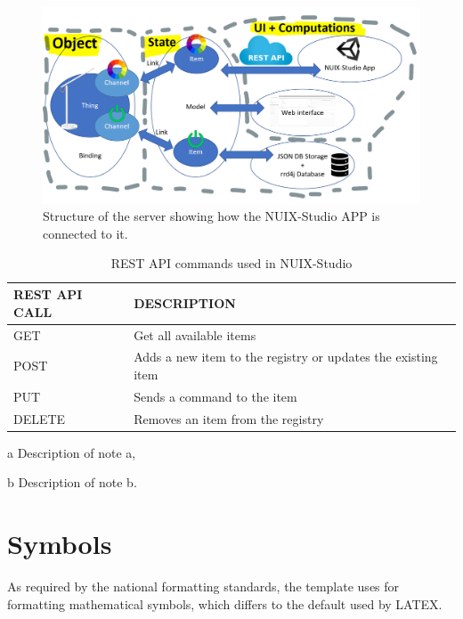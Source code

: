 \begin{figure}
  \centering
  \includegraphics[width=0.9\linewidth]{figures/ExtendedServerStructure.png}
  \caption{Structure of the server showing how the NUIX-Studio APP is connected to it.}
  \label{fig:ExtendedServerStructure-figure}
\end{figure}

\begin{table}
  \centering
  \begin{threeparttable}[c]
    \caption{REST API commands used in NUIX-Studio}
    \label{tab:three-part-table}
    \begin{tabular}{ll}
      \toprule
      REST API CALL    &         DESCRIPTION                 \\
      \midrule
      GET\tnote{a} & Get all available items \\
      POST\tnote{b} & Adds a new item to the registry or updates the existing item    \\
      PUT        & Sends a command to the item                              \\
      DELETE        & Removes an item from the registry          \\
      \bottomrule
    \end{tabular}
    \begin{tablenotes}
      \item [a] Description of note a,
      \item [b] Description of note b.
    \end{tablenotes}
  \end{threeparttable}
\end{table}

\section{Symbols}

As required by the national formatting standards, the template uses  for formatting mathematical symbols, which differs to the default used by LATEX. 

